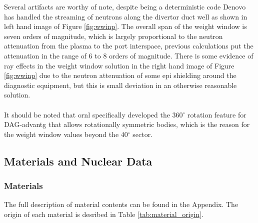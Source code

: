 \documentclass[12pt]{article}
\begin{document}
Several artifacts are worthy of note, despite being a deterministic code Denovo
has handled the streaming of neutrons along the divertor duct well as shown in
left hand image of Figure \ref{fig:wwinp}. The overall span of the weight window
is seven orders of magnitude, which is largely proportional to the neutron
attenuation from the plasma to the port interspace, previous calculations put
the attenuation in the range of 6 to 8 orders of magnitude. There is some
evidence of ray effects in the weight window solution in the right hand image
of Figure \ref{fig:wwinp} due to the neutron attenuation of some \gls{epi}
shielding around the diagnostic equipment, but this is small deviation in an
otherwise reasonable solution.
\\
\\
It should be noted that \gls{ornl} specifically developed the 360$^{\circ}$
rotation feature for DAG-\gls{advantg} that allows rotationally symmetric
bodies, which is the reason for the weight window values beyond the
40$^{\circ}$ sector.
\subsection{Materials and Nuclear Data}
\subsubsection{Materials}
The full description of material contents can be found in the Appendix. The 
origin of each material is desribed in Table \ref{tab:material_origin}. 
\end{document}
